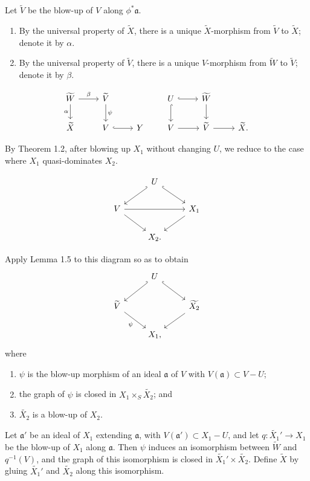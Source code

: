\documentclass[11pt,a4paper]{article}
\theoremstyle{plain}
\theoremstyle{definition}
\begin{document}
Let $\widetilde V$ be the blow-up of $V$ along $\phi^*\mathfrak a$.
\begin{enumerate}[label=(\arabic*)]
\item By the universal property of $\widetilde X$, there is a unique $\widetilde X$-morphism from $\widetilde V$ to $\widetilde X$; denote it by $\alpha$.
\item By the universal property of $\widetilde V$, there is a unique $V$-morphism from $\widetilde W$ to $\widetilde V$; denote it by $\beta$.
\end{enumerate}

\[
\begin{tikzcd}
\widetilde W \arrow[r,"\beta"] \arrow[d,"\alpha"'] & \widetilde V \arrow[d,"\psi"] \\
\widetilde X & V \arrow[r,hook] & Y
\end{tikzcd}
\qquad
\begin{tikzcd}
U \arrow[r,hook] \arrow[d,hook] & \widetilde W \arrow[d] \\
V \arrow[r] & \widetilde V \arrow[r] & \widetilde X .
\end{tikzcd}
\]

By Theorem 1.2, after blowing up $X_1$ without changing $U$, we reduce to the case where $X_1$ quasi-dominates $X_2$.

\[
\begin{tikzcd}
& U \arrow[dl,hook'] \arrow[dr,hook] \\
V \arrow[dr] \arrow[rr] && X_1 \arrow[dl] \\
& X_2 .
\end{tikzcd}
\]

Apply Lemma 1.5 to this diagram so as to obtain
\[
\begin{tikzcd}
& U \arrow[dl,hook'] \arrow[dr,hook] \\
\widetilde V \arrow[dr,"\psi"'] && \widetilde{X_2} \arrow[dl] \\
& X_1,
\end{tikzcd}
\]
where
\begin{enumerate}[label=(\alph*)]
\item $\psi$ is the blow-up morphism of an ideal $\mathfrak a$ of $V$ with $V(\mathfrak a)\subset V-U$;
\item the graph of $\psi$ is closed in $X_1\times_S\widetilde{X_2}$; and
\item $\widetilde{X_2}$ is a blow-up of $X_2$.
\end{enumerate}

Let $\mathfrak a'$ be an ideal of $X_1$ extending $\mathfrak a$, with $V(\mathfrak a')\subset X_1-U$, and let $q:\widetilde{X_1}'\to X_1$ be the blow-up of $X_1$ along $\mathfrak a$. Then $\psi$ induces an isomorphism between $\widetilde W$ and $q^{-1}(V)$, and the graph of this isomorphism is closed in $\widetilde{X_1}'\times\widetilde{X_2}$. Define $\widetilde X$ by gluing $\widetilde{X_1}'$ and $\widetilde{X_2}$ along this isomorphism.
\end{document}
